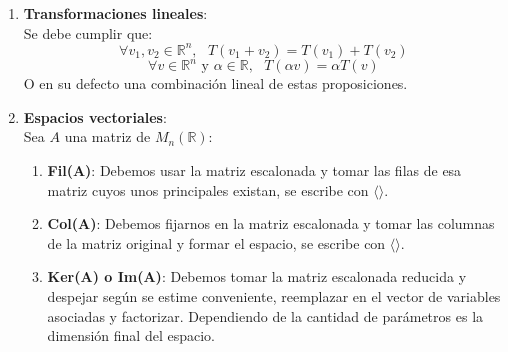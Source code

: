 \documentclass[12pt]{article}
\begin{document}
\begin{enumerate}
\begin{enumerate}
              \item \textbf{Transformaciones lineales}:
                    \\Se debe cumplir que:
                    $$\forall v_1,v_2 \in \mathbb{R}^n,\mbox{ }T(v_1+v_2)=T(v_1)+T(v_2)$$
                    $$\forall v \in \mathbb{R}^n \mbox{ y } \alpha \in \mathbb{R},\mbox{ } T(\alpha v)=\alpha T(v)$$
                    O en su defecto una combinaci\'on lineal de estas proposiciones.
              \item \textbf{Espacios vectoriales}:
                    \\Sea $A$ una matriz de $M_n(\mathbb{R})$:
                    \begin{enumerate}
                        \item \textbf{Fil(A)}: Debemos usar la matriz escalonada y tomar las filas de esa matriz
                              cuyos unos principales existan, se escribe con $\langle \rangle$.
                        \item \textbf{Col(A)}: Debemos fijarnos en la matriz escalonada y tomar las columnas
                              de la matriz original y formar el espacio, se escribe con $\langle \rangle$.
                        \item \textbf{Ker(A) o Im(A)}: Debemos tomar la matriz escalonada reducida y despejar
                              seg\'un se estime conveniente, reemplazar en el vector de variables asociadas y factorizar.
                              Dependiendo de la cantidad de par\'ametros es la dimensi\'on final del espacio.
                    \end{enumerate}
          \end{enumerate}

\end{enumerate}
\end{document}
